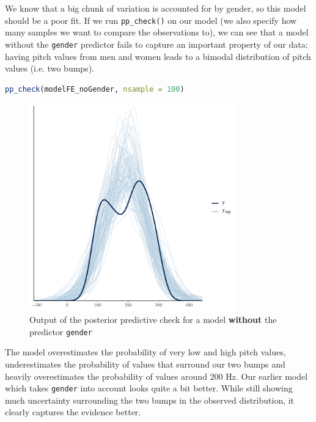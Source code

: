 \documentclass[nobib]{tufte-handout}
\begin{document}
We know that a big chunk of variation is accounted for by gender, so this model should be a poor fit. If we run \texttt{pp\_check()} on our model (we also specify how many samples we want to compare the observations to), we can see that a model without the \texttt{gender} predictor fails to capture an important property of our data: having pitch values from men and women leads to a bimodal distribution of pitch values (i.e. two bumps).

\bigskip

\begin{minipage}[]{1\textwidth}
\begin{lstlisting}[language=R]
pp_check(modelFE_noGender, nsample = 100)
\end{lstlisting}
\end{minipage}

\begin{figure}[]
  \centering
    \includegraphics[width = 0.8\textwidth]{pics/pp_check_FE_noGender.pdf}
    \caption{Output of the posterior predictive check for a model \textbf{without} the predictor \texttt{gender}}
    \label{fig:coefficients_table}
\end{figure}


The model overestimates the probability of very low and high pitch values, underestimates the probability of values that surround our two bumps and heavily overestimates the probability of values around 200 Hz.
Our earlier model which takes \texttt{gender} into account looks quite a bit better. While still showing much uncertainty surrounding the two bumps in the observed distribution, it clearly captures the evidence better. 
\end{document}
